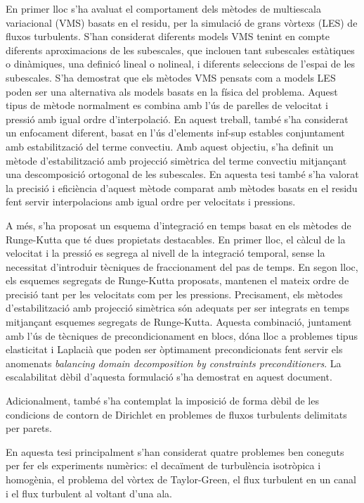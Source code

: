 En primer lloc s'ha avaluat el comportament dels mètodes de multiescala variacional (VMS) basats en el residu, per la simulació de grans vòrtexs (LES) de fluxos turbulents. S'han considerat diferents models VMS tenint en compte diferents aproximacions de les subescales, que inclouen tant subescales estàtiques o dinàmiques, una definicó lineal o nolineal, i diferents seleccions de l'espai de les subescales. S'ha demostrat que els mètodes VMS pensats com a models LES poden ser una alternativa als models basats en la física del problema. Aquest tipus de mètode normalment es combina amb l'ús de parelles de velocitat i pressió amb igual ordre d'interpolació. En aquest treball, també s'ha considerat un enfocament diferent, basat en l'ús d'elements inf-sup estables conjuntament amb estabilització del terme convectiu. Amb aquest objectiu, s'ha definit un mètode d'estabilització amb projecció simètrica del terme convectiu mitjançant una descomposició ortogonal de les subescales. En aquesta tesi també s'ha valorat la precisió i eficiència d'aquest mètode comparat amb mètodes basats en el residu fent servir interpolacions amb igual ordre per velocitats i pressions.

A més, s'ha proposat un esquema d'integració en temps basat en els mètodes de Runge-Kutta que té dues propietats destacables. En primer lloc, el càlcul de la velocitat i la pressió es segrega al nivell de la integració temporal, sense la necessitat d'introduir tècniques de fraccionament del pas de temps. En segon lloc, els esquemes segregats de Runge-Kutta proposats, mantenen el mateix ordre de precisió tant per les velocitats com per les pressions. Precisament, els mètodes d'estabilització amb projecció simètrica són adequats per ser integrats en temps mitjançant esquemes segregats de Runge-Kutta. Aquesta combinació, juntament amb l'ús de tècniques de precondicionament en blocs, dóna lloc a problemes tipus elasticitat i Laplacià que poden ser òptimament precondicionats fent servir els anomenats \textit{balancing domain decomposition by constraints preconditioners}. La escalabilitat dèbil d'aquesta formulació s'ha demostrat en aquest document.

Adicionalment, també s'ha contemplat la imposició de forma dèbil de les condicions de contorn de Dirichlet en problemes de fluxos turbulents delimitats per parets.

En aquesta tesi principalment s'han considerat quatre problemes ben coneguts per fer els experiments numèrics: el decaïment de turbulència isotròpica i homogènia, el problema del vòrtex de Taylor-Green, el flux turbulent en un canal i el flux turbulent al voltant d'una ala.